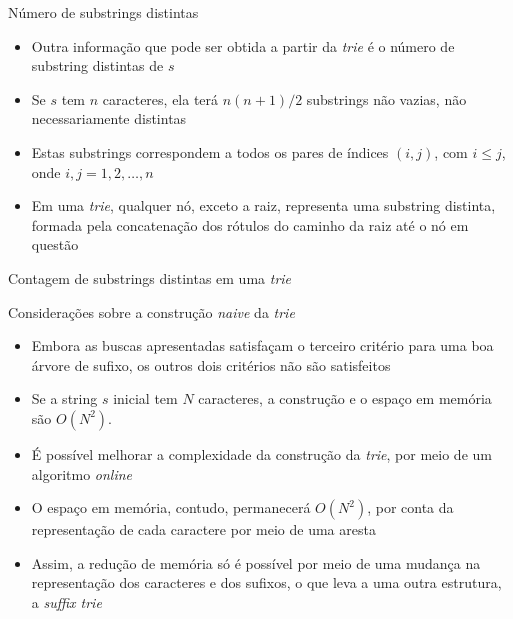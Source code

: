 \begin{frame}[fragile]{Número de substrings distintas}

    \begin{itemize}
        \item Outra informação que pode ser obtida a partir da \textit{trie} é o número de 
            substring distintas de $s$

        \item Se $s$ tem $n$ caracteres, ela terá $n(n + 1)/2$ substrings não vazias, não 
            necessariamente distintas

        \item Estas substrings correspondem a todos os pares de índices $(i, j)$, com 
            $i \leq j$, onde $i, j = 1, 2, \ldots, n$

        \item Em uma \textit{trie}, qualquer nó, exceto a raiz, representa uma substring 
            distinta, formada pela concatenação dos rótulos do caminho da raiz até o nó em
            questão
    \end{itemize}

\end{frame}

\begin{frame}[fragile]{Contagem de substrings distintas em uma {\it trie}}
\end{frame}

\begin{frame}[fragile]{Considerações sobre a construção {\it naive} da {\it trie}}

    \begin{itemize}
        \item Embora as buscas apresentadas satisfaçam o terceiro critério para uma boa árvore de 
            sufixo, os outros dois critérios não são satisfeitos

        \item Se a string $s$ inicial tem $N$ caracteres, a construção e o espaço em memória são 
            $O(N^2)$.

        \item É possível melhorar a complexidade da construção da {\it trie}, por meio de um
            algoritmo \textit{online}

        \item O espaço em memória, contudo, permanecerá $O(N^2)$, por conta da representação de
            cada caractere por meio de uma aresta

        \item Assim, a redução de memória só é possível por meio de uma mudança na representação
            dos caracteres e dos sufixos, o que leva a uma outra estrutura, a \textit{suffix trie}
    \end{itemize}

\end{frame}
